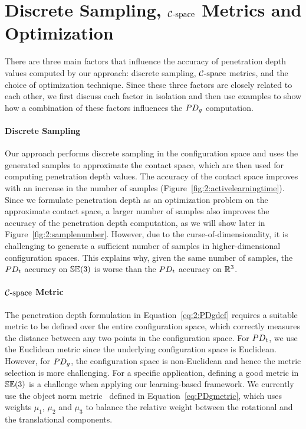 \section{Discrete Sampling, $\mathcal C\text{-space}$ Metrics and Optimization}
\label{sec:2:discussion}

There are three main factors that influence the accuracy of penetration depth values computed by our approach: discrete sampling, $\mathcal C\text{-space}$ metrics, and the choice of optimization technique. Since these three factors are closely related to each other, we first discuss each factor in isolation and then use examples to show how a combination of these factors influences the $PD_g$ computation. 

\paragraph{Discrete Sampling} Our approach performs discrete sampling in the configuration space and uses the generated samples to approximate the contact space, which are then used for computing penetration depth values. The accuracy of the contact space improves with an increase in the number of samples (Figure~\ref{fig:2:activelearningtime}). Since we formulate penetration depth as an optimization problem on the approximate contact space, a larger number of samples also improves the accuracy of the penetration depth computation, as we will show later in Figure~\ref{fig:2:samplenumber}. However, due to the curse-of-dimensionality, it is challenging to generate a sufficient number of samples in higher-dimensional configuration spaces. This explains why, given the same number of samples, the $PD_t$ accuracy on $\mathbb {SE}(3)$ is worse than the $PD_t$ accuracy on $\mathbb R^3$.

\paragraph{$\mathcal C\text{-space}$ Metric} The penetration depth formulation in Equation~\ref{eq:2:PDgdef} requires a suitable metric to be defined over the entire configuration space, which correctly measures the distance between any two points in the configuration space. For $PD_t$, we use the Euclidean metric since the underlying configuration space is Euclidean. However, for $PD_g$, the configuration space is non-Euclidean and hence the metric selection is more challenging. For a specific application, defining a good metric in $\mathbb {SE}(3)$ is a challenge when applying our learning-based framework. We currently use the object norm metric~\cite{Kazerounian:ASME:1992} defined in Equation~\ref{eq:PDgmetric}, which uses weights $\mu_1$, $\mu_2$ and $\mu_3$ to balance the relative weight between the rotational and the translational components. 

